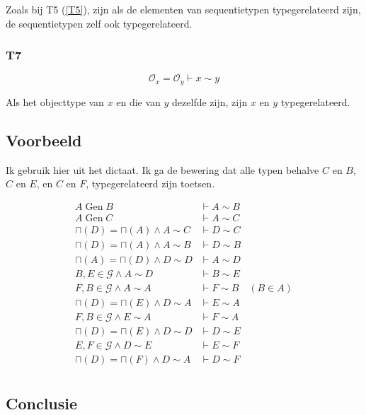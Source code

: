 \documentclass{article}
\begin{document}
Zoals bij T5 (\ref{T5}), zijn als de elementen van sequentietypen 
typegerelateerd zijn, de sequentietypen zelf ook typegerelateerd.

\subsubsection{T7}
\[
  \mathcal{O}_x = \mathcal{O}_y \vdash x \sim y
\]

Als het objecttype van $x$ en die van $y$ dezelfde zijn, zijn $x$ en $y$ 
typegerelateerd.

\clearpage

\subsection{Voorbeeld}

Ik gebruik hier \cite[figuur 2.26]{dictaat} uit het dictaat. Ik ga de bewering 
dat alle typen behalve $C$ en $B$, $C$ en $E$, en $C$ en $F$, typegerelateerd
zijn toetsen.

\begin{align*}
  A \operatorname{Gen} B                 & \vdash A \sim B &           \\
  A \operatorname{Gen} C                 & \vdash A \sim C &           \\
  \sqcap(D) = \sqcap(A) \wedge A \sim C  & \vdash D \sim C &           \\
  \sqcap(D) = \sqcap(A) \wedge A \sim B  & \vdash D \sim B &           \\
  \sqcap(A) = \sqcap(D) \wedge D \sim D  & \vdash A \sim D &           \\
  B, E \in \mathcal{G} \wedge A \sim D   & \vdash B \sim E &           \\
  F, B \in \mathcal{G} \wedge A \sim A   & \vdash F \sim B & (B \in A) \\
  \sqcap(D) = \sqcap (E) \wedge D \sim A & \vdash E \sim A &  \\
  F, B \in \mathcal{G} \wedge E \sim A   & \vdash F \sim A &  \\
  \sqcap(D) = \sqcap(E) \wedge D \sim D  & \vdash D \sim E &  \\
  E, F \in \mathcal{G} \wedge D \sim E   & \vdash E \sim F &  \\
  \sqcap(D) = \sqcap(F) \wedge D \sim A  & \vdash D \sim F & \\
\end{align*}

\subsection{Conclusie}
\end{document}
